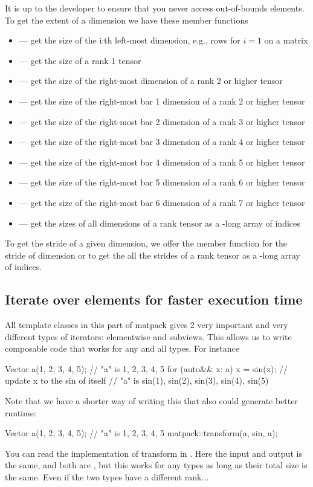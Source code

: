 It is up to the developer to ensure that you never access out-of-bounds elements.
To get the extent of a dimension we have these member functions
\begin{itemize}
\item {} --- get the size of the i:th left-most dimension, e.g., rows for $i=1$ on a matrix
\item {} --- get the size of a rank 1 tensor
\item {} --- get the size of the right-most dimension of a rank 2 or higher tensor
\item {} --- get the size of the right-most bar 1 dimension of a rank 2 or higher tensor
\item {} --- get the size of the right-most bar 2 dimension of a rank 3 or higher tensor
\item {} --- get the size of the right-most bar 3 dimension of a rank 4 or higher tensor
\item {} --- get the size of the right-most bar 4 dimension of a rank 5 or higher tensor
\item {} --- get the size of the right-most bar 5 dimension of a rank 6 or higher tensor
\item {} --- get the size of the right-most bar 6 dimension of a rank 7 or higher tensor
\item {} --- get the sizes of all dimensions of a rank  tensor as a -long array of indices
\end{itemize}
To get the stride of a given dimension, we offer the member function  for the stride of dimension 
or  to get the all the strides of a rank  tensor as a -long array of indices.

\subsection{Iterate over elements for faster execution time}
All template classes in this part of matpack gives 2 very important and very different types
of iterators: elementwise and subviews.  This allows us to write composable code that works
for any and all types.  For instance
\begin{code}
Vector a({1, 2, 3, 4, 5});  // "a" is {1, 2, 3, 4, 5}
for (auto&& x: a) {
  x = sin(x);  // update x to the sin of itself
}  // "a" is {sin(1), sin(2), sin(3), sin(4), sin(5)}
\end{code}
Note that we have a shorter way of writing this that also could generate better runtime:
\begin{code}
Vector a({1, 2, 3, 4, 5});  // "a" is {1, 2, 3, 4, 5}
matpack::transform(a, sin, a);
\end{code}
You can read the implementation of transform in .  Here the input and output is the same, and both are , but this works for any types as long as their total size is the same.  Even if the two types have a different rank...

